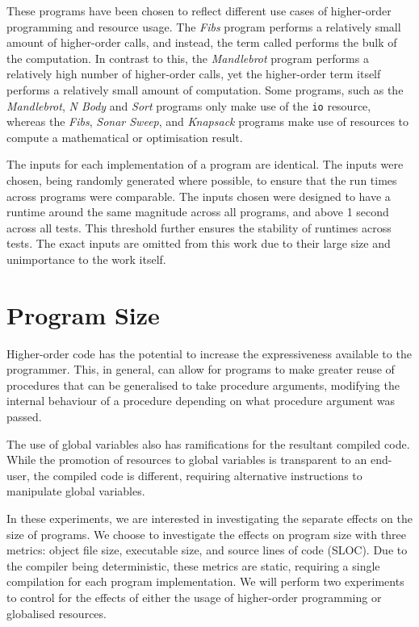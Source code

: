 These programs have been chosen to reflect different use cases of higher-order programming and resource usage. The \textit{Fibs} program performs a relatively small amount of higher-order calls, and instead, the term called performs the bulk of the computation. In contrast to this, the \textit{Mandlebrot} program performs a relatively high number of higher-order calls, yet the higher-order term itself performs a relatively small amount of computation. Some programs, such as the \textit{Mandlebrot}, \textit{N Body} and \textit{Sort} programs only make use of the \texttt{io} resource, whereas the \textit{Fibs}, \textit{Sonar Sweep}, and \textit{Knapsack} programs make use of resources to compute a mathematical or optimisation result.

The inputs for each implementation of a program are identical. The inputs were chosen, being randomly generated where possible, to ensure that the run times across programs were comparable. The inputs chosen were designed to have a runtime around the same magnitude across all programs, and above 1 second across all tests. This threshold further ensures the stability of runtimes across tests. The exact inputs are omitted from this work due to their large size and unimportance to the work itself. 

\section{Program Size}
\label{sec:program-size}

Higher-order code has the potential to increase the expressiveness available to the programmer. This, in general, can allow for programs to make greater reuse of procedures that can be generalised to take procedure arguments, modifying the internal behaviour of a procedure depending on what procedure argument was passed. 

The use of global variables also has ramifications for the resultant compiled code. While the promotion of resources to global variables is transparent to an end-user, the compiled code is different, requiring alternative instructions to manipulate global variables.

In these experiments, we are interested in investigating the separate effects on the size of programs. We choose to investigate the effects on program size with three metrics: object file size, executable size, and source lines of code (SLOC). Due to the compiler being deterministic, these metrics are static, requiring a single compilation for each program implementation. We will perform two experiments to control for the effects of either the usage of higher-order programming or globalised resources. 


